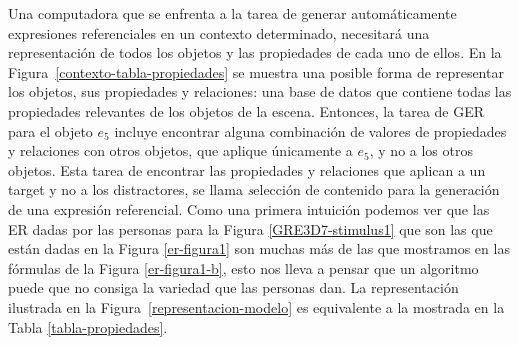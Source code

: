Una computadora que se enfrenta a la tarea de generar autom\'aticamente expresiones referenciales en un contexto determinado, necesitar\'a una representaci\'on de todos los objetos y las propiedades de cada uno de ellos. En la Figura~\ref{contexto-tabla-propiedades} se muestra una posible forma de representar los objetos, sus propiedades y relaciones: una base de datos que contiene todas las propiedades relevantes de los objetos de la escena. Entonces, la tarea de GER para el objeto $e_5$ incluye encontrar alguna combinaci\'on de valores de propiedades y relaciones con otros objetos, que aplique \'unicamente a $e_5$, y no a los otros objetos. Esta tarea de encontrar las propiedades y relaciones que aplican a un target y no a los distractores, se llama {\emph selecci\'on de contenido para la generaci\'on de una expresi\'on referencial}.
Como una primera intuici\'on podemos ver que las ER dadas por las personas para la Figura \ref{GRE3D7-stimulus1} que son las que est\'an dadas en la Figura \ref{er-figura1} son muchas m\'as de las que mostramos en las f\'ormulas de la Figura \ref{er-figura1-b}, esto nos lleva a pensar que un algoritmo puede que no consiga la variedad que las personas dan. La representaci\'on ilustrada en la Figura~\ref{representacion-modelo} es equivalente a la mostrada en la Tabla \ref{tabla-propiedades}.

